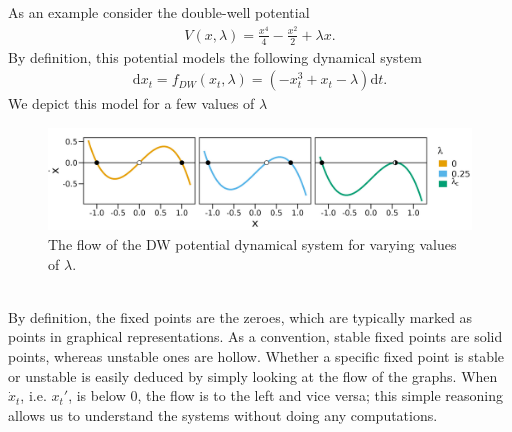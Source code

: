 As an example consider the double-well potential
\begin{align}
    V(x,\lambda) = \frac{x^4}{4} - \frac{x^2}{2} + \lambda x\label{eq:doubleWellPotential}.
\end{align}
By definition, this potential models the following dynamical system
\begin{align}
    \mathrm{d}x_t = f_{DW}(x_t, \lambda) = \left(-x_t^3 + x_t - \lambda \right) \mathrm{d}t \label{eq:originalDW}.
\end{align}
We depict this model for a few values of $\lambda$
\begin{figure}[h]
    \begin{center}
        \includegraphics[scale = .14]{figures/double_well_plot.jpeg}
        \caption{The flow of the DW potential dynamical system for varying values of $\lambda$.}
        \label{figure:DW_dynamic_plot}
    \end{center}
\end{figure}\\
By definition, the fixed points are the zeroes, which are typically marked as points in graphical representations. As a convention, stable fixed points are solid points, whereas unstable ones are hollow. Whether a specific fixed point is stable or unstable is easily deduced by simply looking at the flow of the graphs. When $\dot{x}_t$, i.e. $x_t'$, is below 0, the flow is to the left and vice versa; this simple reasoning allows us to understand the systems without doing any computations.

